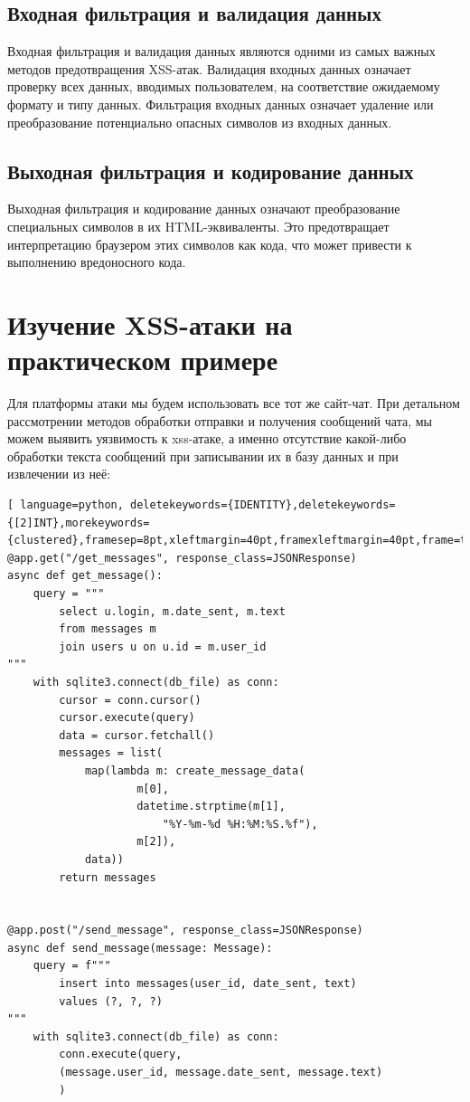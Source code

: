 \documentclass[a4paper,12pt]{diplom}
\begin{document}
	 \subsection{Входная фильтрация и валидация данных}
	 
	 Входная фильтрация и валидация данных являются одними из самых важных методов предотвращения XSS-атак. Валидация входных данных означает проверку всех данных, вводимых пользователем, на соответствие ожидаемому формату и типу данных. Фильтрация входных данных означает удаление или преобразование потенциально опасных символов из входных данных.
	 
	 \subsection{Выходная фильтрация и кодирование данных}
	 
	 Выходная фильтрация и кодирование данных означают преобразование специальных символов в их HTML-эквиваленты. Это предотвращает интерпретацию браузером этих символов как кода, что может привести к выполнению вредоносного кода. 
	 
	 
	 
	 
	 
	 
	 
	 
	 
	 \section{Изучение XSS-атаки на практическом примере}
	 
	 Для платформы атаки мы будем использовать все тот же сайт-чат. При детальном рассмотрении методов обработки отправки и получения сообщений чата, мы можем выявить уязвимость к xss-атаке, а именно отсутствие какой-либо обработки текста сообщений при записывании их в базу данных и при извлечении из неё:
	 
	 
	 \begin{lstlisting}[ language=python, deletekeywords={IDENTITY},deletekeywords={[2]INT},morekeywords={clustered},framesep=8pt,xleftmargin=40pt,framexleftmargin=40pt,frame=tb,framerule=0pt]    
@app.get("/get_messages", response_class=JSONResponse)
async def get_message():
	query = """
		select u.login, m.date_sent, m.text
		from messages m
		join users u on u.id = m.user_id
"""
	with sqlite3.connect(db_file) as conn:
		cursor = conn.cursor()
		cursor.execute(query)
		data = cursor.fetchall()
		messages = list(
			map(lambda m: create_message_data(
					m[0], 
					datetime.strptime(m[1], 
						"%Y-%m-%d %H:%M:%S.%f"), 
					m[2]), 
			data))
		return messages


@app.post("/send_message", response_class=JSONResponse)
async def send_message(message: Message):
	query = f"""
		insert into messages(user_id, date_sent, text)
		values (?, ?, ?)
"""
	with sqlite3.connect(db_file) as conn:
		conn.execute(query, 
		(message.user_id, message.date_sent, message.text)
		)
	 \end{lstlisting}
	 
\end{document}
